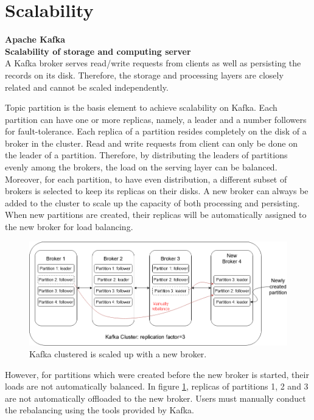 \section{Scalability}
\large \textbf{Apache Kafka}\\
\normalsize
\textbf{Scalability of storage and computing server}\\
A Kafka broker serves read/write requests from clients as well as persisting the records on its disk. Therefore, the storage and processing layers are closely related and cannot be scaled independently.  

Topic partition is the basis element to achieve scalability on Kafka. Each partition can have one or more replicas, namely, a leader and a number followers for fault-tolerance. Each replica of a partition resides completely on the disk of a broker in the cluster. Read and write requests from client can only be done on the leader of a partition. Therefore, by distributing the leaders of partitions evenly among the brokers, the load on the serving layer can be balanced. Moreover, for each partition, to have even distribution, a different subset of brokers is selected to keep its replicas on their disks. A new broker can always be added to the cluster to scale up the capacity of both processing and persisting. When new partitions are created, their replicas will be automatically assigned to the new broker for load balancing.
\begin{figure}[h]
	\centering
	\includegraphics[width=\linewidth]{images/scalability-kafka.png}
	\caption{Kafka clustered is scaled up with a new broker.}
	\label{fig:scalabilitykafka}
\end{figure}

However, for partitions which were created before the new broker is started, their loads are not automatically balanced. In figure \ref{fig:scalabilitykafka}, replicas of partitions 1, 2 and 3 are not automatically offloaded to the new broker. Users must manually conduct the rebalancing using the tools provided by Kafka.

